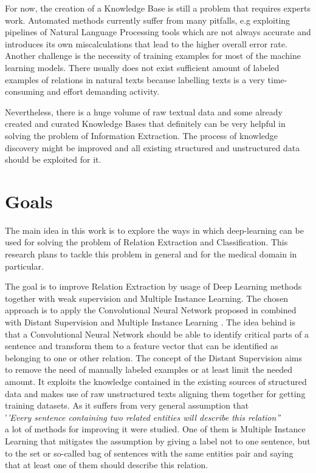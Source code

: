 For now, the creation of
a Knowledge Base is still a problem that requires experts work. Automated methods currently suffer 
from many pitfalls, e.g exploiting pipelines of Natural Language Processing tools which are not always 
accurate and introduces its own miscalculations that lead to the higher overall error rate. Another 
challenge is the necessity of training examples for most of the machine learning models. There 
usually does not exist sufficient amount of labeled examples of 
relations in natural texts because labelling texts is a very time-consuming and 
effort demanding activity. 

Nevertheless, there is a huge volume of raw textual data and some already created and curated 
Knowledge Bases that definitely can be very helpful in solving the problem of Information Extraction. 
The process of knowledge discovery might be improved and all existing structured and 
unstructured data should be exploited for it.

\section{Goals}
The main idea in this work is to explore the ways in which deep-learning can be 
used for solving the problem of Relation Extraction and Classification. This research
plans to tackle this problem in general and for the medical domain in particular. 

The goal is to improve Relation Extraction by usage of Deep Learning methods together with 
weak supervision and Multiple Instance Learning. The chosen approach is to
apply the Convolutional Neural Network proposed in 
\cite{DBLP:journals/corr/SantosXZ15} combined with Distant Supervision \cite{Mintz:2009:DSR:1690219.1690287} 
and Multiple Instance Learning \cite{zeng2015distant}. The idea behind is that a Convolutional Neural Network 
should be able to identify critical parts of a sentence and transform them to a feature vector 
that can be identified as belonging to one or other relation. The concept of the Distant Supervision 
aims to remove the need of manually labeled examples or at least limit the needed amount. It 
exploits the knowledge contained in the existing sources of structured data and makes use of 
raw unstructured texts aligning them together for getting training datasets. As it suffers from 
very general assumption that 
\\'\textit{'Every sentence containing two related entities will describe this 
relation'' }
\\a lot of methods for improving it were studied. One of them is Multiple Instance Learning 
that mitigates the assumption by giving a label not to one sentence, but to the set or so-called 
bag of sentences with the same entities pair and saying that at least one of them should describe this 
relation. 

